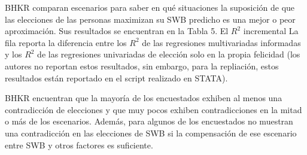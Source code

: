 \documentclass[12pt,spanish]{article}
\begin{document}
BHKR comparan escenarios para saber en qué situaciones la suposición de que las elecciones de las personas maximizan su SWB predicho es una mejor o peor aproximación. Sus resultados se encuentran en la Tabla 5. El $R^2$ incremental La fila reporta la diferencia entre los $R^2$ de las regresiones multivariadas informadas y los $R^2$ de las regresiones univariadas de elección solo en la propia felicidad (los autores no reportan estos resultados, sin embargo, para la repliación, estos resultados están reportado en el script realizado en STATA). 

BHKR encuentran que la mayoría de los encuestados exhiben al menos una contradicción de elecciones y que muy pocos exhiben contradicciones en la mitad o más de los escenarios. Además, para algunos de los encuestados no muestran una contradicción en las elecciones de SWB si la compensación de ese escenario entre SWB y otros factores es suficiente. 
\end{document}
